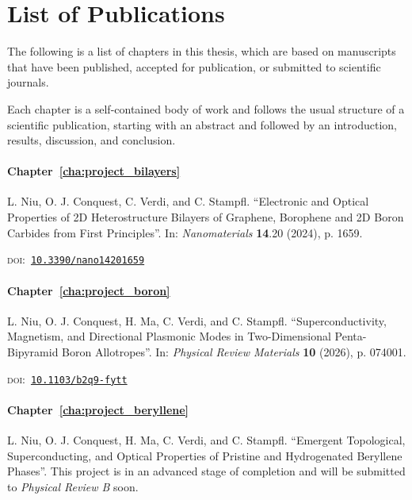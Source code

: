 \chapter*{List of Publications}

The following is a list of chapters in this thesis,
which are based on manuscripts that have been published,
accepted for publication,
or submitted to scientific journals.

Each chapter is a self-contained body of work and follows the usual structure of a scientific publication,
starting with an abstract and followed by an introduction, results, discussion, and conclusion.

\par\vspace{\baselineskip}

\subsubsection*{Chapter~\ref{cha:project_bilayers}}

L. Niu, O. J. Conquest, C. Verdi, and C. Stampfl.
``Electronic and Optical Properties of 2D Heterostructure Bilayers of Graphene, Borophene and 2D Boron Carbides from First Principles''.
In: \textit{Nanomaterials} \textbf{14}.20 (2024), p. 1659.
\par\textsc{doi}:~\href{https://doi.org/10.3390/nano14201659}{\texttt{10.3390/nano14201659}}

\subsubsection*{Chapter~\ref{cha:project_boron}}

L. Niu, O. J. Conquest, H. Ma, C. Verdi, and C. Stampfl.
``Superconductivity, Magnetism, and Directional Plasmonic Modes in Two-Dimensional Penta-Bipyramid Boron Allotropes''.
In: \textit{Physical Review Materials} \textbf{10} (2026), p. 074001.
\par\textsc{doi}:~\href{https://doi.org/10.1103/b2q9-fytt}{\texttt{10.1103/b2q9-fytt}}

\subsubsection*{Chapter~\ref{cha:project_beryllene}}

L. Niu, O. J. Conquest, H. Ma, C. Verdi, and C. Stampfl.
``Emergent Topological, Superconducting, and Optical Properties of Pristine and Hydrogenated Beryllene Phases''.
This project is in an advanced stage of completion and will be submitted to \textit{Physical Review B} soon.

